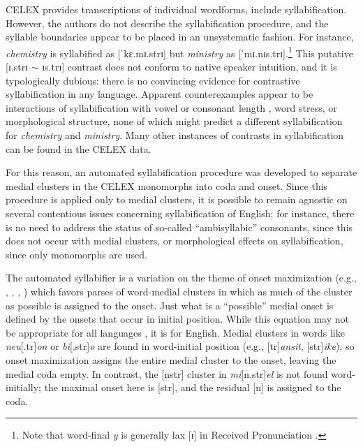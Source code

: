 CELEX provides transcriptions of individual wordforms, include syllabification. However, the authors do not describe the syllabification procedure, and the syllable boundaries appear to be placed in an unsystematic fashion. For instance, \emph{chemistry} is syllabified as [ˈkɛ.mɪ.strɪ] but \emph{ministry} as [ˈmɪ.nɪs.trɪ].\footnote{Note that word-final \emph{y} is generally lax [ɪ] in Received Pronunciation \citep[][II.294]{AOE}.} This putative [ɪ.strɪ $\sim$ ɪs.trɪ] contrast does not conform to native speaker intuition, and it is typologically dubious: there is no convincing evidence for contrastive syllabification in any language. Apparent counterexamples appear to be interactions of syllabification with vowel or consonant length \citep[e.g.,][]{Elfner2006}, word stress, or morphological structure, none of which might predict a different syllabification for \emph{chemistry} and \emph{ministry}. Many other instances of contrasts in syllabification can be found in the CELEX data. 

For this reason, an automated syllabification procedure was developed to separate medial clusters in the CELEX  monomorphs into coda and onset. Since this procedure is applied only to medial clusters, it is possible to remain agnostic on several contentious issues concerning syllabification of English; for instance, there is no need to address the status of so-called ``ambisyllabic'' consonants, since this does not occur with medial clusters, or morphological effects on syllabification, since only monomorphs are used. 

The automated syllabifier is a variation on the theme of onset maximization (e.g., \citealt{Kurylowicz1948}, \citealt[75]{Pulgram1970}, \citealt[42f.]{Kahn1976}, \citealt[][358f.]{Selkirk1982b}) which favors parses of word-medial clusters in which as much of the cluster as possible is assigned to the onset. Just what is a ``possible'' medial onset is defined by the onsets that occur in initial position. While this equation may not be appropriate for all languages \citep[306]{Fischer-Jorgensen1952}, it is for English. Medial clusters in words like \emph{neu}[.tr]\emph{on} or \emph{bi}[.str]\emph{o} are found in word-initial position (e.g., [tr]\emph{ansit}, [str]\emph{ike}), so onset maximization assigns the entire medial cluster to the onset, leaving the medial coda empty. In contrast, the [nstr] cluster in \emph{mi}[n.str]\emph{el} is not found word-initially; the maximal onset here is [str], and the residual [n] is assigned to the coda.  

